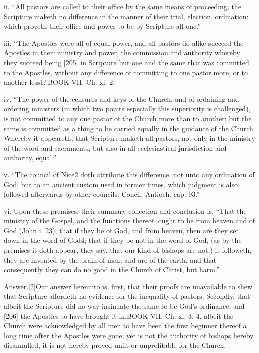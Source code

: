 ii. “All pastors are called to their office by the same means of proceeding; the Scripture maketh no difference in the manner of their trial, election, ordination: which proveth their office and power to be by Scripture all one.”

iii. “The Apostles were all of equal power, and all pastors do alike succeed the Apostles in their ministry and power, the commission and authority whereby they succeed being [205] in Scripture but one and the same that was committed to the Apostles, without any difference of committing to one pastor more, or to another less1.”BOOK VII. Ch. xi. 2.

iv. “The power of the censures and keys of the Church, and of ordaining and ordering ministers (in which two points especially this superiority is challenged), is not committed to any one pastor of the Church more than to another; but the same is committed as a thing to be carried equally in the guidance of the Church. Whereby it appeareth, that Scripture maketh all pastors, not only in the ministry of the word and sacraments, but also in all ecclesiastical jurisdiction and authority, equal.”

v. “The council of Nice2 doth attribute this difference, not unto any ordination of God, but to an ancient custom used in former times, which judgment is also followed afterwards by other councils: Concil. Antioch. cap. 93.”

vi. Upon these premises, their summary collection and conclusion is, “That the ministry of the Gospel, and the functions thereof, ought to be from heaven and of God (John i. 23); that if they be of God, and from heaven, then are they set down in the word of God4; that if they be not in the word of God, (as by the premises it doth appear, they say, that our kind of bishops are not,) it followeth, they are invented by the brain of men, and are of the earth, and that consequently they can do no good in the Church of Christ, but harm.”

Answer.[2]Our answer hereunto is, first, that their proofs are unavailable to shew that Scripture affordeth no evidence for the inequality of pastors: Secondly, that albeit the Scripture did no way insinuate the same to be God’s ordinance, and [206] the Apostles to have brought it in,BOOK VII. Ch. xi. 3, 4. albeit the Church were acknowledged by all men to have been the first beginner thereof a long time after the Apostles were gone; yet is not the authority of bishops hereby disannulled, it is not hereby proved unfit or unprofitable for the Church.

